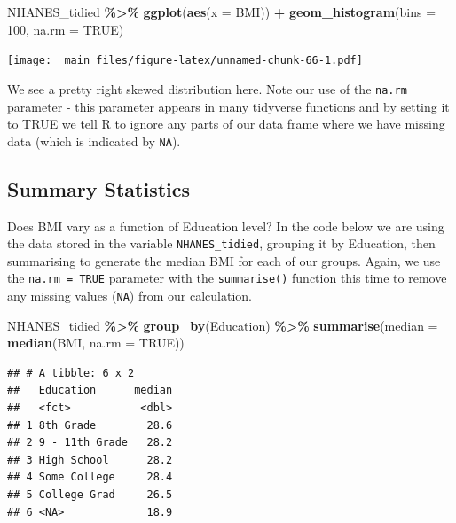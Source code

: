 \documentclass[
]{book}
\newenvironment{Shaded}{\begin{snugshade}}{\end{snugshade}}
\newcommand{\AttributeTok}[1]{\textcolor[rgb]{0.13,0.29,0.53}{#1}}
\newcommand{\ConstantTok}[1]{\textcolor[rgb]{0.56,0.35,0.01}{#1}}
\newcommand{\DecValTok}[1]{\textcolor[rgb]{0.00,0.00,0.81}{#1}}
\newcommand{\FunctionTok}[1]{\textcolor[rgb]{0.13,0.29,0.53}{\textbf{#1}}}
\newcommand{\NormalTok}[1]{#1}
\newcommand{\SpecialCharTok}[1]{\textcolor[rgb]{0.81,0.36,0.00}{\textbf{#1}}}
\begin{document}
\begin{Shaded}
\begin{Highlighting}[]
\NormalTok{NHANES\_tidied }\SpecialCharTok{\%\textgreater{}\%}
  \FunctionTok{ggplot}\NormalTok{(}\FunctionTok{aes}\NormalTok{(}\AttributeTok{x =}\NormalTok{ BMI)) }\SpecialCharTok{+} 
  \FunctionTok{geom\_histogram}\NormalTok{(}\AttributeTok{bins =} \DecValTok{100}\NormalTok{, }\AttributeTok{na.rm =} \ConstantTok{TRUE}\NormalTok{)}
\end{Highlighting}
\end{Shaded}

\texttt{[image: \_main\_files/figure-latex/unnamed-chunk-66-1.pdf]}

We see a pretty right skewed distribution here. Note our use of the \texttt{na.rm} parameter - this parameter appears in many tidyverse functions and by setting it to TRUE we tell R to ignore any parts of our data frame where we have missing data (which is indicated by \texttt{NA}).

\hypertarget{summary-statistics}{%
\subsection{Summary Statistics}\label{summary-statistics}}

Does BMI vary as a function of Education level? In the code below we are using the data stored in the variable \texttt{NHANES\_tidied}, grouping it by Education, then summarising to generate the median BMI for each of our groups. Again, we use the \texttt{na.rm\ =\ TRUE} parameter with the \texttt{summarise()} function this time to remove any missing values (\texttt{NA}) from our calculation.

\begin{Shaded}
\begin{Highlighting}[]
\NormalTok{NHANES\_tidied }\SpecialCharTok{\%\textgreater{}\%} 
  \FunctionTok{group\_by}\NormalTok{(Education) }\SpecialCharTok{\%\textgreater{}\%} 
  \FunctionTok{summarise}\NormalTok{(}\AttributeTok{median =} \FunctionTok{median}\NormalTok{(BMI, }\AttributeTok{na.rm =} \ConstantTok{TRUE}\NormalTok{))}
\end{Highlighting}
\end{Shaded}

\begin{verbatim}
## # A tibble: 6 x 2
##   Education      median
##   <fct>           <dbl>
## 1 8th Grade        28.6
## 2 9 - 11th Grade   28.2
## 3 High School      28.2
## 4 Some College     28.4
## 5 College Grad     26.5
## 6 <NA>             18.9
\end{verbatim}
\end{document}
